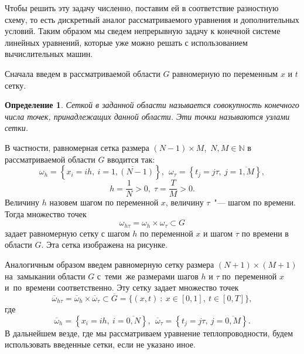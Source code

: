 \documentclass[11pt,a4paper,twoside]{report}
\numberwithin{equation}{section}
\newtheorem*{definition}{Определение}
\theoremstyle{definition}
\theoremstyle{plain}
\begin{document}
Чтобы решить эту задачу численно, поставим ей в соответствие разностную схему, то есть
дискретный аналог рассматриваемого уравнения и дополнительных условий.
Таким образом мы сведем непрерывную задачу к конечной системе линейных
уравнений, которые уже можно решать с использованием вычислительных машин.

Сначала введем в рассматриваемой области $G$ равномерную по переменным
$x$ и $t$ сетку.
%
\begin{definition}
%
    Сеткой в заданной области называется совокупность конечного числа точек,
    принадлежащих данной области. Эти точки называются узлами сетки.
%
\end{definition}
%
В частности, равномерная сетка размера $(N-1)\times M$,\, $N, M \in\mathbb{N}$
в рассматриваемой области $G$ вводится так:
%
$$
%
    \omega_h = \left\{x_i = ih, ~i = \overline{1, (N - 1)}\right\},~~
    \omega_{\tau} = \left\{t_j = j\tau , ~j = \overline{1, M}\right\},
%
$$
%
$$
    h = \dfrac1N > 0,\; \tau = \dfrac{T}{M} > 0.
%
$$
%
Величину $h$ назовем шагом по переменной $x$, величину $\tau$~"--- шагом по времени. \\
Тогда множество точек
%
$$
    \omega_{h \tau} = \omega_h \times \omega_\tau \subset G
$$
%
задает равномерную сетку с шагом $h$ по переменной $x$ и шагом $\tau$
по времени в области $G$. Эта сетка изображена на рисунке.
%
\begin{figure}[H]
\centering
{}
\end{figure}

Аналогичным образом введем равномерную сетку размера $(N+1)\times(M+1)$
на~замыкании области $G$ с~теми~же размерами шагов $h$ и $\tau$ по~переменной
$x$ и~по~времени соответственно. Эту сетку задает множество точек
%
$$
    \overline{\omega}_{h \tau} = \overline{\omega}_h \times \overline{\omega}_\tau
    \subset \overline{G} = \{(x,t)~:~x \in [0,1],~t\in [0,T]\},
$$
%
где
%
$$
    \overline{\omega}_h = \left\{x_i = ih,~i = \overline{0, N}\right\},~~
    \overline{\omega}_{\tau} = \left\{t_j = j\tau ,~j = \overline{0,M}\right\}.
$$
%
В дальнейшем везде, где мы рассматриваем уравнение теплопроводности, будем использовать
введенные сетки, если не указано иное.
\end{document}
